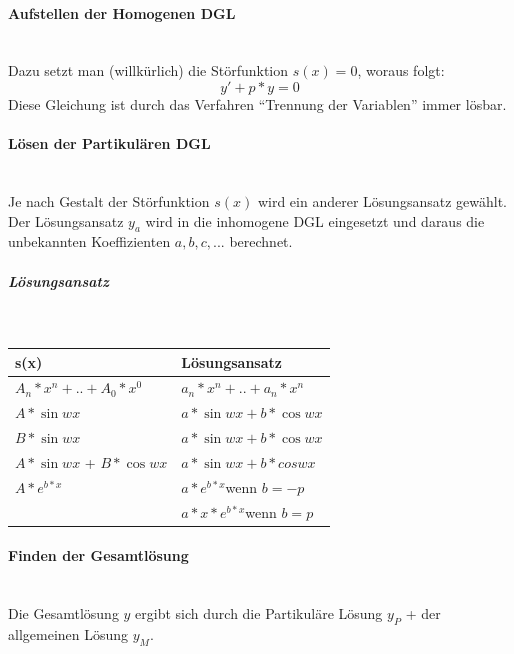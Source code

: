 \documentclass[a4paper,12pt]{article}
\begin{document}
\paragraph{Aufstellen der Homogenen DGL}~\\
Dazu setzt man (willkürlich) die Störfunktion $s(x) = 0$, woraus folgt:
$$y' + p * y = 0$$
Diese Gleichung ist durch das Verfahren ``Trennung der Variablen'' immer lösbar.

\paragraph{L\"osen der Partikul\"aren DGL}~\\
Je nach Gestalt der St\"orfunktion $s(x)$ wird ein anderer L\"osungsansatz gew\"ahlt.
Der Lösungsansatz $y_a$ wird in die inhomogene DGL eingesetzt und daraus die unbekannten Koeffizienten $a, b, c, ...$ berechnet.
\subparagraph{L\"osungsansatz}~\\
\begin{tabular}{l|l}
 s(x) & Lösungsansatz\\
 \hline \hline
 $A_n * x^n + .. + A_0 * x^0$\quad & $a_n * x^n + .. + a_n * x^n$\\
 \hline
 $A * \sin{wx}$ & $a * \sin{wx} + b * \cos{wx}$\\
 $B * \sin{wx}$ & $a * \sin{wx} + b * \cos{wx}$\\
 $A * \sin{wx}$ + $B * \cos{wx}$ & $a * \sin{wx} + b * cos{wx}$\\
 \hline
 $A * e^{b * x}$ & $a * e^{b * x}$\hfill \small{wenn} $b = -p$\\
 & $a * x * e^{b * x}$\hfill \small{wenn} $b = p$
\end{tabular}

\paragraph{Finden der Gesamtlösung}~\\
Die Gesamtl\"osung $y$ ergibt sich durch die Partikul\"are L\"osung $y_P$ + der allgemeinen L\"osung $y_M$.
\end{document}
